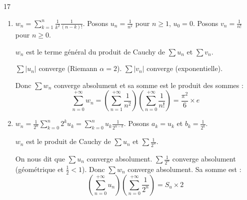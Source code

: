\begin{correction}{17}
\begin{enumerate}
    \item $\displaystyle w_n = \sum_{k=1}^n \frac{1}{k^2} \frac{1}{(n-k)!}$.
        Posons $u_n = \frac{1}{n^2}$ pour $n \geqslant 1$, $u_0=0$.
        Posons $v_n = \frac{1}{n!}$ pour $n \geqslant 0$.

        $w_n$ est le terme général du produit de Cauchy de $\sum u_n$ et $\sum v_n$.
        
        $\sum |u_n|$ converge (Riemann $\alpha=2$).
        $\sum |v_n|$ converge (exponentielle).

        Donc $\sum w_n$ converge absolument et sa somme est le produit des sommes :
        \[\sum_{n=0}^{+\infty} w_n = \left(\sum_{n=1}^{+\infty} \frac{1}{n^2}\right) \left(\sum_{n=0}^{+\infty} \frac{1}{n!}\right) = \frac{\pi^2}{6} \times e\]

    \item $\displaystyle w_n = \frac{1}{2^n} \sum_{k=0}^n 2^k u_k = \sum_{k=0}^n u_k \frac{1}{2^{n-k}}$.
        Posons $a_k = u_k$ et $b_k = \frac{1}{2^k}$.

        $w_n$ est le produit de Cauchy de $\sum u_n$ et $\sum \frac{1}{2^n}$.

        On nous dit que $\sum u_n$ converge absolument.
        $\sum \frac{1}{2^n}$ converge absolument (géométrique et $\frac 1 2 < 1$).
        Donc $\sum w_n$ converge absolument.
        Sa somme est :
        \[\left(\sum_{n=0}^{+\infty} u_n\right) \left(\sum_{n=0}^{+\infty} \frac{1}{2^n}\right) = S_u \times 2\]
\end{enumerate}
\end{correction}
